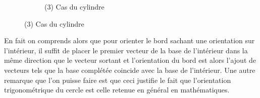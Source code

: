 \begin{figure}[htbp]
\begin{subfigure}{0.3\textwidth}
               \caption*{(3) Cas du cylindre}
            \end{subfigure}      
         \end{figure}
      En fait on comprends alors que pour orienter le bord sachant une orientation sur l'intérieur, il suffit de placer le premier vecteur de la base de l'intérieur dans la même direction que le vecteur sortant et l'orientation du bord est alors l'ajout de vecteurs tels que la base complétée coincide avec la base de l'intérieur. Une autre remarque que l'on puisse faire est que ceci justifie le fait que l'orientation trigonométrique du cercle est celle retenue en général en mathématiques.
